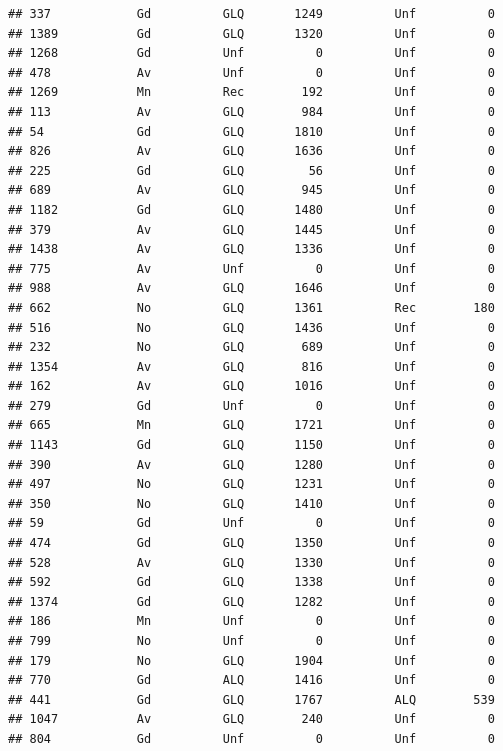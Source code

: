 \documentclass[]{article}
\begin{document}
\begin{verbatim}
## 337            Gd          GLQ       1249          Unf          0
## 1389           Gd          GLQ       1320          Unf          0
## 1268           Gd          Unf          0          Unf          0
## 478            Av          Unf          0          Unf          0
## 1269           Mn          Rec        192          Unf          0
## 113            Av          GLQ        984          Unf          0
## 54             Gd          GLQ       1810          Unf          0
## 826            Av          GLQ       1636          Unf          0
## 225            Gd          GLQ         56          Unf          0
## 689            Av          GLQ        945          Unf          0
## 1182           Gd          GLQ       1480          Unf          0
## 379            Av          GLQ       1445          Unf          0
## 1438           Av          GLQ       1336          Unf          0
## 775            Av          Unf          0          Unf          0
## 988            Av          GLQ       1646          Unf          0
## 662            No          GLQ       1361          Rec        180
## 516            No          GLQ       1436          Unf          0
## 232            No          GLQ        689          Unf          0
## 1354           Av          GLQ        816          Unf          0
## 162            Av          GLQ       1016          Unf          0
## 279            Gd          Unf          0          Unf          0
## 665            Mn          GLQ       1721          Unf          0
## 1143           Gd          GLQ       1150          Unf          0
## 390            Av          GLQ       1280          Unf          0
## 497            No          GLQ       1231          Unf          0
## 350            No          GLQ       1410          Unf          0
## 59             Gd          Unf          0          Unf          0
## 474            Gd          GLQ       1350          Unf          0
## 528            Av          GLQ       1330          Unf          0
## 592            Gd          GLQ       1338          Unf          0
## 1374           Gd          GLQ       1282          Unf          0
## 186            Mn          Unf          0          Unf          0
## 799            No          Unf          0          Unf          0
## 179            No          GLQ       1904          Unf          0
## 770            Gd          ALQ       1416          Unf          0
## 441            Gd          GLQ       1767          ALQ        539
## 1047           Av          GLQ        240          Unf          0
## 804            Gd          Unf          0          Unf          0

\end{verbatim}
\end{document}
